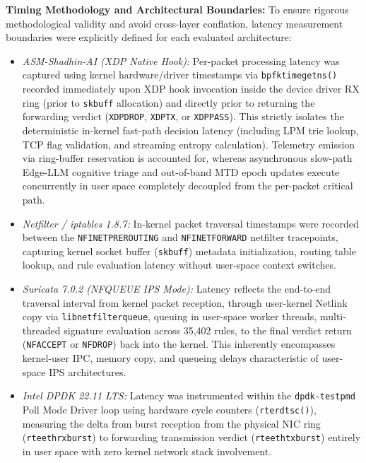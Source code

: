 \documentclass{ieeeaccess}
\renewcommand{\_}{\textunderscore\allowbreak}
\begin{document}
\textbf{Timing Methodology and Architectural Boundaries:}
To ensure rigorous methodological validity and avoid cross-layer conflation, latency measurement boundaries were explicitly defined for each evaluated architecture:
\begin{itemize}
  \item \textit{ASM-Shadhin-AI (XDP Native Hook):} Per-packet processing latency was captured using kernel hardware/driver timestamps via \texttt{bpf\_ktime\_get\_ns()} recorded immediately upon XDP hook invocation inside the device driver RX ring (prior to \texttt{sk\_buff} allocation) and directly prior to returning the forwarding verdict (\texttt{XDP\_DROP}, \texttt{XDP\_TX}, or \texttt{XDP\_PASS}). This strictly isolates the deterministic in-kernel fast-path decision latency (including LPM trie lookup, TCP flag validation, and streaming entropy calculation). Telemetry emission via ring-buffer reservation is accounted for, whereas asynchronous slow-path Edge-LLM cognitive triage and out-of-band MTD epoch updates execute concurrently in user space completely decoupled from the per-packet critical path.
  \item \textit{Netfilter / iptables 1.8.7:} In-kernel packet traversal timestamps were recorded between the \texttt{NF\_INET\_PRE\_ROUTING} and \texttt{NF\_INET\_FORWARD} netfilter tracepoints, capturing kernel socket buffer (\texttt{sk\_buff}) metadata initialization, routing table lookup, and rule evaluation latency without user-space context switches.
  \item \textit{Suricata 7.0.2 (NFQUEUE IPS Mode):} Latency reflects the end-to-end traversal interval from kernel packet reception, through user-kernel Netlink copy via \texttt{libnetfilter\_queue}, queuing in user-space worker threads, multi-threaded signature evaluation across 35,402 rules, to the final verdict return (\texttt{NF\_ACCEPT} or \texttt{NF\_DROP}) back into the kernel. This inherently encompasses kernel-user IPC, memory copy, and queueing delays characteristic of user-space IPS architectures.
  \item \textit{Intel DPDK 22.11 LTS:} Latency was instrumented within the \texttt{dpdk-testpmd} Poll Mode Driver loop using hardware cycle counters (\texttt{rte\_rdtsc()}), measuring the delta from burst reception from the physical NIC ring (\texttt{rte\_eth\_rx\_burst}) to forwarding transmission verdict (\texttt{rte\_eth\_tx\_burst}) entirely in user space with zero kernel network stack involvement.
\end{itemize}
\end{document}
